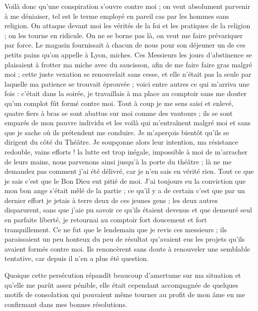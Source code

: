 \documentclass[11pt,a4paper]{report}
\begin{document}
Voilà donc qu'une conspiration s'ouvre contre moi ; on veut absolument parvenir à me déniaiser, tel est le terme employé en pareil cas par les hommes sans religion. On attaque devant moi les vérités de la foi et les pratiques de la religion ; on les tourne en ridicule. On ne se borne pas là, on veut me faire prévariquer par force. Le magasin fournissait à chacun de nous pour son déjeuner un de ces petits pains qu'on appelle à Lyon, miches. Ces Messieurs les jours d'abstinence se plaisaient à frotter ma miche avec du saucisson, afin de me faire faire gras malgré moi ; cette juste vexation se renouvelait sans cesse, et elle n'était pas la seule par laquelle ma patience se trouvait éprouvée ; voici entre autres ce qui m'arriva une fois : c'était dans la soirée, je travaillais à ma place au comptoir sans me douter qu'un complot fût formé contre moi. Tout à coup je me sens saisi et enlevé, quatre fiers à bras se sont abattus sur moi comme des vautours ; ils se sont emparés de mon pauvre individu et les voilà qui m'entraînent malgré moi et sans que je sache où ils prétendent me conduire. Je m'aperçois bientôt qu'ils se dirigent du côté du Théâtre. Je soupçonne alors leur intention, ma résistance redouble, vains efforts ! la lutte est trop inégale, impossible à moi de m'arracher de leurs mains, nous parvenons ainsi jusqu'à la porte du théâtre ; là ne me demandez pas comment j'ai été délivré, car je n'en sais en vérité rien. Tout ce que je sais c'est que le Bon Dieu eut pitié de moi. J'ai toujours eu la conviction que mon bon ange s'était mêlé de la partie ; ce qu'il y a de certain c'est que par un dernier effort je jetais à terre deux de ces jeunes gens ; les deux autres disparurent, sans que j'aie pu savoir ce qu'ils étaient devenus et que demeuré seul en parfaite liberté, je retournai au comptoir fort doucement et fort tranquillement. Ce ne fut que le lendemain que je revis ces messieurs ; ils paraissaient un peu honteux du peu de résultat qu'avaient eus les projets qu'ils avaient formés contre moi. Ils renoncèrent sans doute à renouveler une semblable tentative, car depuis il n'en a plus été question.

Quoique cette persécution répandît beaucoup d'amertume sur ma situation et qu'elle me parût assez pénible, elle était cependant accompagnée de quelques motifs de consolation qui pouvaient même tourner au profit de mon âme en me confirmant dans mes bonnes résolutions.
\end{document}
